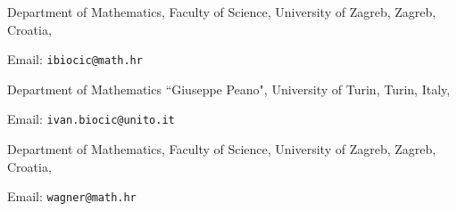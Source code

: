 \documentclass[12pt,a4paper,onecolumn]{amsart}
\theoremstyle{definition}
\newcommand{\1}{\mathbf 1}
\numberwithin{equation}{section}
\begin{document}
	
	

	\bigskip
	
	
	\noindent Department of Mathematics, Faculty of Science, University of Zagreb, Zagreb, Croatia,
	
	\noindent Email: \texttt{ibiocic@math.hr}
    
        \noindent Department of Mathematics ``Giuseppe Peano", University of Turin, Turin, Italy,
	
	\noindent Email: \texttt{ivan.biocic@unito.it}
	
	\bigskip
	
	
	\noindent Department of Mathematics, Faculty of Science, University of Zagreb, Zagreb, Croatia,
	
	\noindent Email: \texttt{wagner@math.hr}
\end{document}
